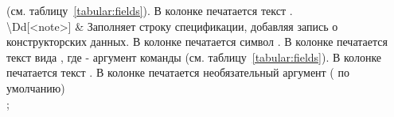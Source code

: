 \begin{tikztablex}
{(см. таблицу~\ref{tabular:fields}). В колонке
\colorbox{resultcolor}{} печатается текст
.\\
\textbackslash{}Dd[<note>] &
Заполняет строку спецификации, добавляя запись о конструкторских данных. В колонке
\colorbox{resultcolor}{} печатается символ \sfemph{-}. В колонке
\colorbox{resultcolor}{} печатается текст вида
, где  - аргумент команды
(см. таблицу~\ref{tabular:fields}). В колонке
\colorbox{resultcolor}{} печатается текст . В колонке \colorbox{resultcolor}{} печатается
необязательный аргумент  ( по умолчанию)\\
};
\end{tikztablex}
